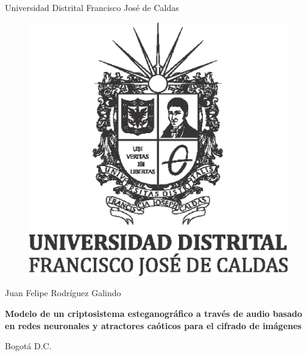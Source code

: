 \documentclass[12pt,a4paper]{report}
\begin{document}
  \pagestyle{empty}
  \begin{center}

    \large{Universidad Distrital Francisco Jos\'e de Caldas}
    

    \vfill
    {\bf\Large }

    \vfill
    \begin{figure}[h]
      \centering
      \vspace{5mm}	%
      \includegraphics[width=0.7\linewidth]{ima/logoud_0_php7YvUJr}
    \end{figure}

    \vfill
    \vspace{5mm}
    {\large Juan Felipe Rodr\'iguez Galindo}

    \vspace{5mm}
    {\large\bfseries Modelo de un criptosistema esteganogr\'afico a través de audio basado en redes neuronales y atractores ca\'oticos para el cifrado de im\'agenes}

    \vfill
    Bogotá D.C.

    \vfill
    \date{\today}
  \end{center}

  \newpage
\end{document}
